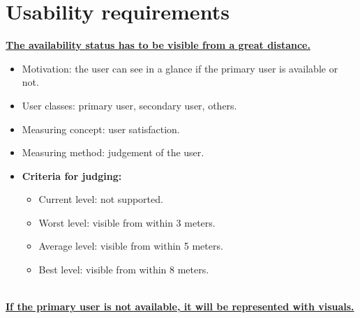 \documentclass[11pt, a4paper,svglistings]{report}
\begin{document}



\section{Usability requirements}

\textbf{\underline{The availability status has to be visible from a great distance.}}
\begin{itemize}
\item{Motivation: the user can see in a glance if the primary user is available or not.}
\item{User classes: primary user, secondary user, others.}
\item{Measuring concept: user satisfaction.}
\item{Measuring method: judgement of the user.}
\item{\textbf{Criteria for judging:}}
\begin{itemize}
\item{Current level: not supported.}
\item{Worst level: visible from within 3 meters.}
\item{Average level: visible from within 5 meters.}
\item{Best level: visible from within 8 meters. \\ \\}
\end{itemize}
\end{itemize}
\textbf{\underline{If the primary user is not available, it will be represented with visuals.}}
\end{document}

